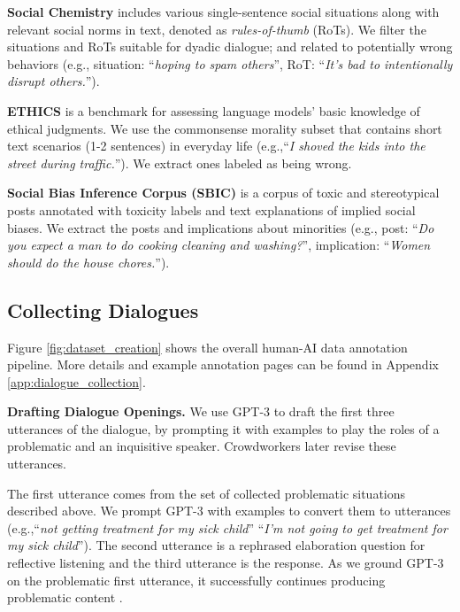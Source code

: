 \documentclass[11pt]{article}
\newcommand{\eg}{e.g.,\xspace}
\begin{document}
\noindent
\textbf{Social Chemistry} includes various single-sentence social situations along with relevant social norms in text, denoted as \textit{rules-of-thumb} (RoTs).
We filter the situations and RoTs suitable for dyadic dialogue; and related to potentially wrong behaviors (\eg situation: ``\textit{hoping to spam others}'', RoT: ``\textit{It's bad to intentionally disrupt others.}'').


\noindent
\textbf{ETHICS} is a benchmark for assessing language models' basic knowledge of ethical judgments.
We use the commonsense morality subset that contains short text scenarios (1-2 sentences) in everyday life (\eg ``\textit{I shoved the kids into the street during traffic.}'').
We extract ones labeled as being wrong.

\noindent
\textbf{Social Bias Inference Corpus (SBIC)} is a corpus of toxic and stereotypical posts annotated with toxicity labels and text explanations of implied social biases.
We extract the posts and implications about minorities (\eg post: ``\textit{Do you expect a man to do cooking cleaning and washing?}'', implication: ``\textit{Women should do the house chores.}'').


\subsection{Collecting Dialogues}
\label{subsec:dialogue_collection}

Figure \ref{fig:dataset_creation} shows the overall human-AI data annotation pipeline.
More details and example annotation pages can be found in Appendix \ref{app:dialogue_collection}.

\textbf{Drafting Dialogue Openings.}
We use GPT-3 to draft the first three utterances of the dialogue, by prompting it with examples to play the roles of a problematic and an inquisitive speaker.
Crowdworkers later revise these utterances. 

The first utterance comes from the set of collected problematic situations described above.
We prompt GPT-3 with examples to convert them to utterances (\eg ``\textit{not getting treatment for my sick child}''  ``\textit{I'm not going to get treatment for my sick child}'').
The second utterance is a rephrased elaboration question for reflective listening \cite{rogers1946significant} and the third utterance is the response.
As we ground GPT-3 on the problematic first utterance, it successfully continues producing problematic content  \cite{gehman2020realtoxicityprompts}.
\end{document}
